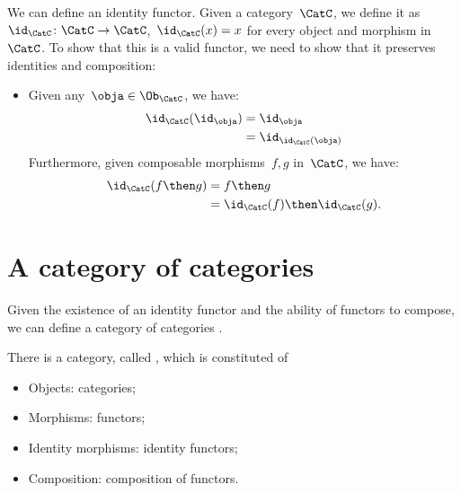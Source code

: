 We can define an identity functor. Given a category~$\CatC$, we define it as~$\id_\CatC\colon \CatC \to \CatC$,~$\id_\CatC(x)=x$ for every object and morphism in~$\CatC$. To show that this is a valid functor, we need to show that it preserves identities and composition:
\begin{itemize}
    \item Given any~$\obja \in \Ob_\CatC$, we have:
    \begin{equation*}
        \begin{aligned}
            \id_\CatC(\id_\obja)&=\id_\obja\\
            &=\id_{\id_\CatC(\obja)}
        \end{aligned}
    \end{equation*}
    Furthermore, given composable morphisms~$f,g$ in~$\CatC$, we have:
    \begin{equation*}
        \begin{aligned}
            \id_{\CatC}(f\then g)&=f\then g\\
            &=\id_{\CatC}(f)\then \id_{\CatC} (g).
        \end{aligned}
    \end{equation*}
\end{itemize}


\section{A category of categories}

Given the existence of an identity functor and the ability of functors to compose, we can define a category of categories \Category.

\begin{ctdefinition}
    There is a category, called \Category, which is constituted of
    \begin{itemize}
        \item Objects: categories;
        \item Morphisms: functors;
        \item Identity morphisms: identity functors;
        \item Composition: composition of functors.
    \end{itemize}
\end{ctdefinition}
